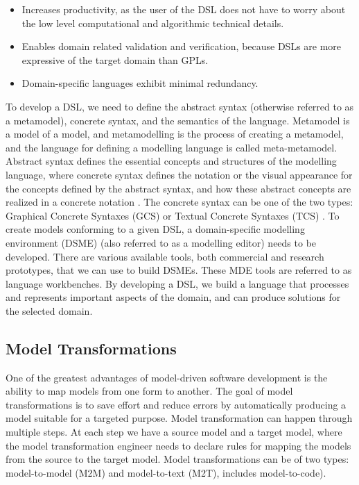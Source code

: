 \documentclass[11pt,letterpaper]{ryersonSGSThesis}
\begin{document}
\begin{ryersonSGSThesis}
            \begin{itemize}
                \item Increases productivity, as the user of the DSL does not have to worry about the low level computational and algorithmic technical details.
                \item Enables domain related validation and verification, because DSLs are more expressive of the target domain than GPLs.
                \item Domain-specific languages exhibit minimal redundancy.
            \end{itemize}
            
            To develop a DSL, we need to define the abstract syntax (otherwise referred to as a metamodel), concrete syntax, and the semantics of the language. Metamodel is a model of a model, and metamodelling is the process of creating a metamodel, and the language for defining a modelling language is called meta-metamodel.
            Abstract syntax defines the essential concepts and structures of the modelling language, where concrete syntax defines the notation or the visual appearance for the concepts defined by the abstract syntax, and how these abstract concepts are realized in a concrete notation \cite{Kahlaoui2008}. The concrete syntax can be one of the two types: Graphical Concrete Syntaxes (GCS) or Textual Concrete Syntaxes (TCS) \cite{Brambilla2017}. To create models conforming to a given DSL, a domain-specific modelling environment (DSME) (also referred to as a modelling editor) needs to be developed. There are various available tools, both commercial and research prototypes, that we can use to build DSMEs. These MDE tools are referred to as language workbenches. By developing a DSL, we build a language that processes and represents important aspects of the domain, and can produce solutions for the selected domain. 
            
        \subsection{Model Transformations}
            One of the greatest advantages of model-driven software development
            is the ability to map models from one form to another. The goal of model transformations is to save effort and reduce errors by automatically producing a model suitable for a targeted purpose. Model transformation can happen through multiple steps. At each step we have a source model and a target model, where the model transformation engineer needs to declare rules for mapping the models from the source to the target model. Model transformations can be of two types: model-to-model (M2M) and model-to-text (M2T), includes model-to-code).
    

\end{ryersonSGSThesis}
\end{document}
